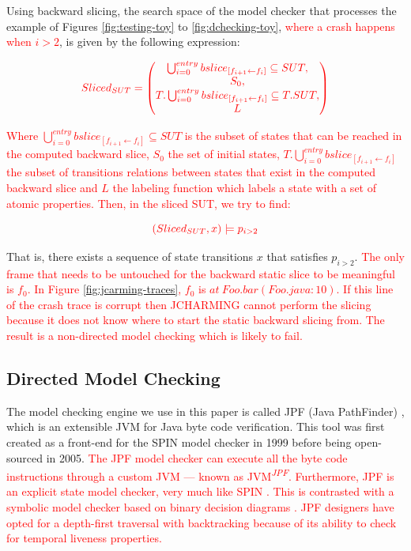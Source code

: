 \documentclass[times, doublespace]{smrauth}
\newcommand{\red}[1]{\textcolor{red}{#1}}
\begin{document}
{Using backward slicing, the search space of the model checker
that processes the example of Figures \ref{fig:testing-toy} to \ref{fig:dchecking-toy}, \red{where a crash happens when $i>2$}, is given by the following expression:

\begin{equation}
  \red{
  Sliced_{SUT} =
  \begin{pmatrix}
    \bigcup_{i=0}^{entry} bslice_{[f_{i+1} \leftarrow f_i]} \subseteq SUT, \\
    S_0, \\
    T.\bigcup_{i=0}^{entry} bslice_{[f_{i+1} \leftarrow f_i]}  \subseteq T.SUT, \\
    L
  \end{pmatrix}
  }
\end{equation}

\red{\noindent Where $\bigcup_{i=0}^{entry} bslice_{[f_{i+1} \leftarrow f_i]} \subseteq SUT$ is the subset of states that can be reached in the computed backward slice, $S_0$ the set of initial states, $T.\bigcup_{i=0}^{entry} bslice_{[f_{i+1} \leftarrow f_i]}$ the subset of transitions relations between states that exist in the computed backward slice and $L$ the labeling function which labels a state with a set of atomic properties.
Then, in the sliced SUT, we try to find:}

\begin{equation}
  \red{
    (Sliced_{SUT}, x) \models p_{i>2}
  }
\end{equation}

That is, there exists a sequence of state transitions $x$ that
satisfies $p_{i>2}$. \red{The only frame that
needs to be untouched for the backward static slice to be
meaningful is $f_0$. In Figure \ref{fig:jcarming-traces}, $f_0$ is $at~ Foo.bar(Foo.java:10)$.
If this line of the crash trace is corrupt then JCHARMING cannot perform the slicing because it does not know where to start the static backward slicing from.
The result is a non-directed model checking which is likely to fail.}

\subsection{Directed Model Checking}

The model checking engine we use in this paper is called JPF
(Java PathFinder) \cite{Visser2004}, which is an extensible JVM for Java
byte code verification. This tool was first created as a front-end
for the SPIN model checker \cite{holzmann1997model} in 1999 before being
open-sourced in 2005.
\red{The JPF model checker can execute all the byte code instructions through a custom JVM --- known as JVM\textsuperscript{\textit{JPF}}. Furthermore, JPF is an explicit state model checker,
very much like SPIN \cite{holzmann1997model}. This is contrasted with a symbolic model
checker based on binary decision diagrams \cite{mcmillan1993symbolic}.
JPF designers have opted for a depth-first traversal with backtracking  because of its ability to check for temporal liveness properties.}

}
\end{document}
